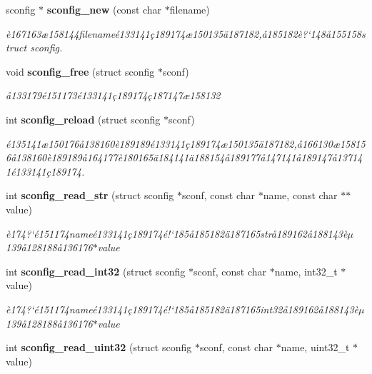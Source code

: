\begin{CompactItemize}
\item 
sconfig $\ast$ {\bf sconfig\_\-new} (const char $\ast$filename)
\begin{CompactList}\small\item\em \`{e}167163\ae{}158144filename\'{e}133141\c{c}189174\ae{}150135\"{a}187182,\aa{}185182\`{e}?`148\aa{}155158struct sconfig. \item\end{CompactList}\item 
void {\bf sconfig\_\-free} (struct sconfig $\ast$sconf)
\begin{CompactList}\small\item\em \aa{}133179\'{e}151173\'{e}133141\c{c}189174\c{c}187147\ae{}158132 \item\end{CompactList}\item 
int {\bf sconfig\_\-reload} (struct sconfig $\ast$sconf)
\begin{CompactList}\small\item\em \'{e}135141\ae{}150176\aa{}138160\`{e}189189\'{e}133141\c{c}189174\ae{}150135\"{a}187182,\aa{}166130\ae{}158156\aa{}138160\`{e}189189\aa{}164177\`{e}180165\"{a}184141\"{a}188154\aa{}189177\aa{}147141\aa{}189147\aa{}137141\'{e}133141\c{c}189174. \item\end{CompactList}\item 
int {\bf sconfig\_\-read\_\-str} (struct sconfig $\ast$sconf, const char $\ast$name, const char $\ast$$\ast$value)
\begin{CompactList}\small\item\em \`{e}174?`\'{e}151174name\'{e}133141\c{c}189174\'{e}!`185\aa{}185182\"{a}187165str\aa{}189162\aa{}188143\`{e}$\mu$139\aa{}128188\aa{}136176$\ast$value \item\end{CompactList}\item 
int {\bf sconfig\_\-read\_\-int32} (struct sconfig $\ast$sconf, const char $\ast$name, int32\_\-t $\ast$value)
\begin{CompactList}\small\item\em \`{e}174?`\'{e}151174name\'{e}133141\c{c}189174\'{e}!`185\aa{}185182\"{a}187165int32\aa{}189162\aa{}188143\`{e}$\mu$139\aa{}128188\aa{}136176$\ast$value \item\end{CompactList}\item 
int {\bf sconfig\_\-read\_\-uint32} (struct sconfig $\ast$sconf, const char $\ast$name, uint32\_\-t $\ast$value)
$$
\end{CompactItemize}
